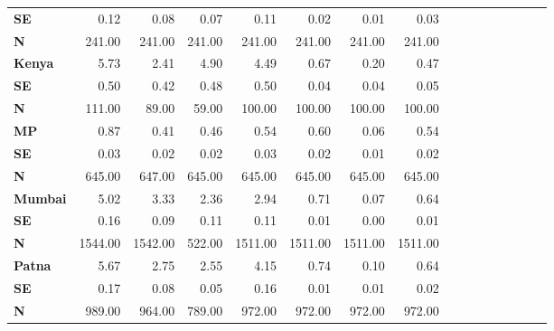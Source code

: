 \begin{tabular}{@{\extracolsep{5pt}}lrrrrrrrrrrrrrrr}
{\bf SE} & 0.12\phantom{***} & 0.08\phantom{***} & 0.07\phantom{***} & 0.11\phantom{***} & 0.02\phantom{***} & 0.01\phantom{***} & 0.03\phantom{***} \\
{\bf N} & 241.00\phantom{***} & 241.00\phantom{***} & 241.00\phantom{***} & 241.00\phantom{***} & 241.00\phantom{***} & 241.00\phantom{***} & 241.00\phantom{***} \\
{\bf Kenya} & 5.73\phantom{***} & 2.41\phantom{***} & 4.90\phantom{***} & 4.49\phantom{***} & 0.67\phantom{***} & 0.20\phantom{***} & 0.47\phantom{***} \\
{\bf SE} & 0.50\phantom{***} & 0.42\phantom{***} & 0.48\phantom{***} & 0.50\phantom{***} & 0.04\phantom{***} & 0.04\phantom{***} & 0.05\phantom{***} \\
{\bf N} & 111.00\phantom{***} & 89.00\phantom{***} & 59.00\phantom{***} & 100.00\phantom{***} & 100.00\phantom{***} & 100.00\phantom{***} & 100.00\phantom{***} \\
{\bf MP} & 0.87\phantom{***} & 0.41\phantom{***} & 0.46\phantom{***} & 0.54\phantom{***} & 0.60\phantom{***} & 0.06\phantom{***} & 0.54\phantom{***} \\
{\bf SE} & 0.03\phantom{***} & 0.02\phantom{***} & 0.02\phantom{***} & 0.03\phantom{***} & 0.02\phantom{***} & 0.01\phantom{***} & 0.02\phantom{***} \\
{\bf N} & 645.00\phantom{***} & 647.00\phantom{***} & 645.00\phantom{***} & 645.00\phantom{***} & 645.00\phantom{***} & 645.00\phantom{***} & 645.00\phantom{***} \\
{\bf Mumbai} & 5.02\phantom{***} & 3.33\phantom{***} & 2.36\phantom{***} & 2.94\phantom{***} & 0.71\phantom{***} & 0.07\phantom{***} & 0.64\phantom{***} \\
{\bf SE} & 0.16\phantom{***} & 0.09\phantom{***} & 0.11\phantom{***} & 0.11\phantom{***} & 0.01\phantom{***} & 0.00\phantom{***} & 0.01\phantom{***} \\
{\bf N} & 1544.00\phantom{***} & 1542.00\phantom{***} & 522.00\phantom{***} & 1511.00\phantom{***} & 1511.00\phantom{***} & 1511.00\phantom{***} & 1511.00\phantom{***} \\
{\bf Patna} & 5.67\phantom{***} & 2.75\phantom{***} & 2.55\phantom{***} & 4.15\phantom{***} & 0.74\phantom{***} & 0.10\phantom{***} & 0.64\phantom{***} \\
{\bf SE} & 0.17\phantom{***} & 0.08\phantom{***} & 0.05\phantom{***} & 0.16\phantom{***} & 0.01\phantom{***} & 0.01\phantom{***} & 0.02\phantom{***} \\
{\bf N} & 989.00\phantom{***} & 964.00\phantom{***} & 789.00\phantom{***} & 972.00\phantom{***} & 972.00\phantom{***} & 972.00\phantom{***} & 972.00\phantom{***} \\
\hline
\end{tabular}

